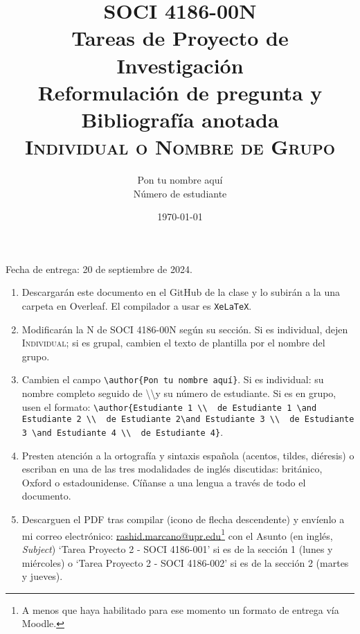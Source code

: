 \documentclass[11pt]{article}
\title{SOCI 4186-00N\\ Tareas de Proyecto de Investigación \textnumero 2 \\ Reformulación de pregunta y Bibliografía anotada \\ \textsc{Individual o Nombre de Grupo}}
\author{Pon tu nombre aquí \\ Número de estudiante}
\date{\today} %
\begin{document}
\singlespacing
\maketitle
Fecha de entrega: 20 de septiembre de 2024.

\begin{enumerate}
    \item Descargarán este documento en el GitHub de la clase y lo subirán a la una carpeta en Overleaf. El compilador a usar es \texttt{XeLaTeX}.
    \item Modificarán la N de SOCI 4186-00N según su sección. Si es individual, dejen \textsc{Individual}; si es grupal, cambien el texto de plantilla por el nombre del grupo.
    \item Cambien el campo \texttt{\textbackslash author\{Pon tu nombre aquí\}}. Si es individual: su nombre completo seguido de \textbackslash\textbackslash y su número de estudiante. Si es en grupo, usen el formato: \texttt{\textbackslash author\{Estudiante 1 \textbackslash\textbackslash \ \textnumero\ de Estudiante 1 \textbackslash and Estudiante 2 \textbackslash\textbackslash \ \textnumero\ de Estudiante 2\textbackslash and Estudiante 3 \textbackslash\textbackslash \ \textnumero\ de Estudiante 3 \textbackslash and Estudiante 4 \textbackslash\textbackslash\ \textnumero\ de Estudiante 4\}}.
    \item Presten atención a la ortografía y sintaxis española (acentos, tildes, diéresis) o escriban en una de las tres modalidades de inglés discutidas: británico, Oxford o estadounidense. Cíñanse a una lengua a través de todo el documento.
    \item Descarguen el PDF tras compilar (icono de flecha descendente) y envíenlo a mi correo electrónico: \href{mailto:rashid.marcano@upr.edu}{rashid.marcano@upr.edu}\footnote{A menos que haya habilitado para ese momento un formato de entrega vía Moodle.} con el Asunto (en inglés, \textit{Subject}) `Tarea Proyecto 2 - SOCI 4186-001' si es de la sección 1 (lunes y miércoles) o `Tarea Proyecto 2 - SOCI 4186-002' si es de la sección 2 (martes y jueves).
\end{enumerate}
\end{document}
